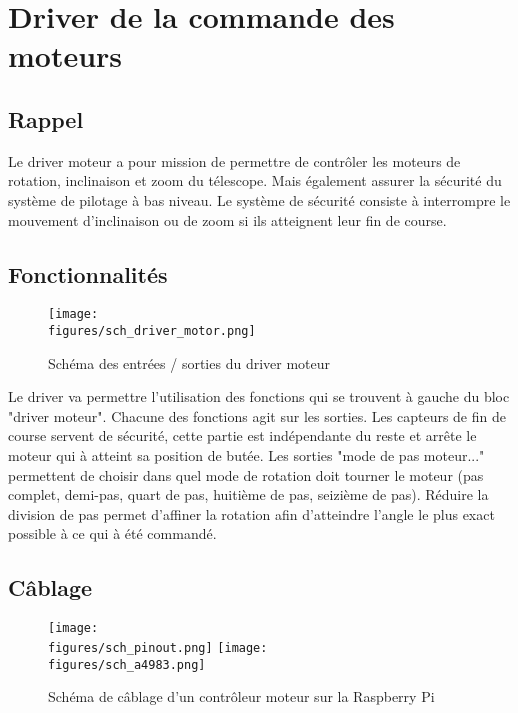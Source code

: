 \chapter{Driver de la commande des moteurs}

\section{Rappel}

Le driver moteur a pour mission de permettre de contrôler les moteurs de rotation, inclinaison et zoom du télescope. Mais également assurer la sécurité du système de pilotage à bas niveau. Le système de sécurité consiste à interrompre le mouvement d’inclinaison ou de zoom si ils atteignent leur fin de course.

\section{Fonctionnalités}

\begin{figure}[H]
    \centering
    \texttt{[image: \\figures/sch\_driver\_motor.png]}
    \decoRule
    \caption[
    Schéma des entrées / sorties du driver moteur]{
    Schéma des entrées / sorties du driver moteur}
    \label{fig:Schéma des entrées / sorties du driver moteur}
    \end{figure}

\vspace{1cm}

Le driver va permettre l’utilisation des fonctions qui se trouvent à gauche du bloc "driver moteur". Chacune des fonctions agit sur les sorties. Les capteurs de fin de course servent de sécurité, cette partie est indépendante du reste et arrête le moteur qui à atteint sa position de butée.
Les sorties "mode de pas moteur..." permettent de choisir dans quel mode de rotation doit tourner le moteur (pas complet, demi-pas, quart de pas, huitième de pas, seizième de pas). Réduire la division de pas permet d’affiner la rotation afin d’atteindre l’angle le plus exact possible à ce qui à été commandé.

\section{Câblage}

\begin{figure}[H]
    \centering
    \texttt{[image: \\figures/sch\_pinout.png]}
    \texttt{[image: \\figures/sch\_a4983.png]}
    \decoRule
    \caption[
    Schéma de câblage d'un contrôleur moteur sur la Raspberry Pi]{
    Schéma de câblage d'un contrôleur moteur sur la Raspberry Pi}
    \label{fig:Schéma de câblage d'un contrôleur moteur sur la Raspberry Pi}
    \end{figure}

